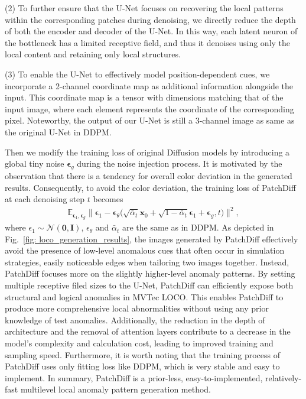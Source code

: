 \documentclass[letterpaper]{article} %
\newcommand{\bepsilon}{{\boldsymbol{\epsilon}}}
\begin{document}
(2) To further ensure that the U-Net focuses on recovering the local patterns within the corresponding patches during denoising, we directly reduce the depth of both the encoder and decoder of the U-Net. In this way, each latent neuron of the bottleneck has a limited receptive field, and thus it denoises using only the local content and retaining only local structures. %

(3) To enable the U-Net to effectively model position-dependent cues, we incorporate a 2-channel coordinate map as additional information alongside the input. This coordinate map is a tensor with dimensions matching that of the input image, where each element represents the coordinate of the corresponding pixel. Noteworthy, the output of our U-Net is still a 3-channel image as same as the original U-Net in DDPM.

Then we modify the training loss of original Diffusion models by introducing a global tiny noise $\bepsilon_{g}$ during the noise injection process. It is motivated by the observation that there is a tendency for overall color deviation in the generated results. Consequently, to avoid the color deviation, the training loss of PatchDiff at each denoising step $t$ becomes 
\begin{equation*}
\begin{aligned}
\mathbb{E}_{\bepsilon_1, \bepsilon_g}
\big\| \bepsilon_1 - \bepsilon_\theta\bigl(\sqrt{\bar{\alpha}_t} \mathbf{x}_0 + \sqrt{1-\bar{\alpha}_t} \bepsilon_1 + \bepsilon_g, t\bigr) \big\|^2,
\end{aligned}
\end{equation*}
where $\epsilon_{1}\sim\mathcal{N}(\mathbf{0}, \mathbf{I})$, $\epsilon_{\theta}$ and $\bar{\alpha}_t$ are the same as in DDPM. 
As depicted in Fig.~\ref{fig: loco_generation_results}, the images generated by PatchDiff effectively avoid the presence of low-level anomalous cues that often occur in simulation strategies, easily noticeable edges when tailoring two images together. 
Instead, PatchDiff focuses more on the slightly higher-level anomaly patterns. By setting multiple receptive filed sizes to the U-Net, PatchDiff can efficiently expose both structural and logical anomalies in MVTec LOCO. This enables PatchDiff to produce more comprehensive local abnormalities without using any prior knowledge of test anomalies. Additionally, the reduction in the depth of architecture and the removal of attention layers contribute to a decrease in the model's complexity and calculation cost, leading to improved training and sampling speed. Furthermore, it is worth noting that the training process of PatchDiff uses only fitting loss like DDPM\cite{DDPM}, which is very stable and easy to implement. In summary, PatchDiff is a prior-less, easy-to-implemented, relatively-fast multilevel local anomaly pattern generation method. 
\end{document}
